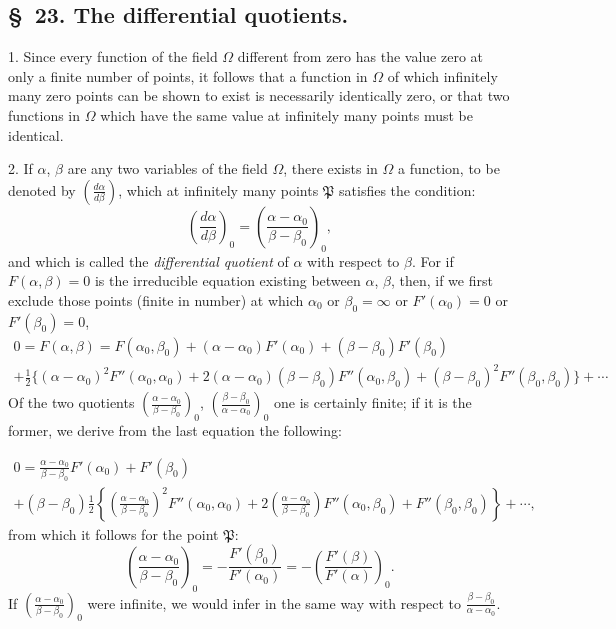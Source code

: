 \documentclass{article}
\begin{document}
\subsection*{§~23. The differential quotients.}

1. Since every function of the field $\Omega$ different from zero has the value zero at only a finite number of points, it follows that a function in $\Omega$ of which infinitely many zero points can be shown to exist is necessarily identically zero, or that two functions in $\Omega$ which have the same value at infinitely many points must be identical.

2. If $\alpha$, $\beta$ are any two variables of the field $\Omega$, there exists in $\Omega$ a function, to be denoted by $\left(\frac{d\alpha}{d\beta}\right)$, which at infinitely many points $\mathfrak{P}$ satisfies the condition:
\[ \left(\frac{d\alpha}{d\beta}\right)_{0} = \left(\frac{\alpha-\alpha_{0}}{\beta-\beta_{0}}\right)_{0}, \]
and which is called the \emph{differential quotient} of $\alpha$ with respect to $\beta$. For if $F(\alpha, \beta) = 0$ is the irreducible equation existing between $\alpha$, $\beta$, then, if we first exclude those points (finite in number) at which $\alpha_{0}$ or $\beta_{0} = \infty$ or $F'(\alpha_{0}) = 0$ or $F'(\beta_{0}) = 0$,
\[ \begin{gathered} 0 = F(\alpha, \beta) = F(\alpha_{0}, \beta_{0}) + (\alpha-\alpha_{0})F'(\alpha_{0}) + (\beta-\beta_{0})F'(\beta_{0}) \\ + \frac{1}{2}\{(\alpha-\alpha_{0})^{2}F''(\alpha_{0}, \alpha_{0}) + 2(\alpha-\alpha_{0})(\beta-\beta_{0})F''(\alpha_{0}, \beta_{0}) + (\beta-\beta_{0})^{2}F''(\beta_{0}, \beta_{0})\} + \cdots \end{gathered} \]
Of the two quotients $\left(\frac{\alpha-\alpha_{0}}{\beta-\beta_{0}}\right)_{0}$, $\left(\frac{\beta-\beta_{0}}{\alpha-\alpha_{0}}\right)_{0}$ one is certainly finite; if it is the former, we derive from the last equation the following:

\[ \begin{gathered} 0 = \frac{\alpha-\alpha_{0}}{\beta-\beta_{0}}F'(\alpha_{0}) + F'(\beta_{0}) \\ + (\beta-\beta_{0})\frac{1}{2}\left\{\left(\frac{\alpha-\alpha_{0}}{\beta-\beta_{0}}\right)^{2}F''(\alpha_{0}, \alpha_{0}) + 2\left(\frac{\alpha-\alpha_{0}}{\beta-\beta_{0}}\right)F''(\alpha_{0}, \beta_{0}) + F''(\beta_{0}, \beta_{0})\right\} + \cdots, \end{gathered} \]
from which it follows for the point $\mathfrak{P}$:
\[ \left(\frac{\alpha-\alpha_{0}}{\beta-\beta_{0}}\right)_{0} = -\frac{F'(\beta_{0})}{F'(\alpha_{0})} = -\left(\frac{F'(\beta)}{F'(\alpha)}\right)_{0}. \]
If $\left(\frac{\alpha-\alpha_{0}}{\beta-\beta_{0}}\right)_{0}$ were infinite, we would infer in the same way with respect to $\frac{\beta-\beta_{0}}{\alpha-\alpha_{0}}$.
\end{document}
